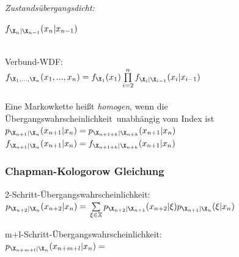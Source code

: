 \documentclass[german,color,6pt]{latex4ei/latex4ei_sheet}
\begin{document}
\begin{sectionbox}
	\emph{Zustandsübergangsdicht:} \\
	\centerline{$ f_{\X_{n} | \X_{n-1}}(x_{n} | x_{n-1})$}\\

	\qquad Verbund-WDF: \\
	$f_{\X_1,...,\X_n}(x_1,...,x_n)=f_{\X_1}(x_1)\prod\limits_{i=2}^{n}f_{\X_i|\X_{i-1}}(x_i|x_{i-1})$ \\ \\


	Eine Markowkette heißt \emph{homogen}, wenn die Übergangswahrscheinlichkeit\ unabhängig vom Index ist \\
	$p_{\X_{n+1} | \X_{n}} (x_{n+1} | x_{n}) = p_{\X_{n+1+k} | \X_{n+k}} (x_{n+1} | x_{n})$ \\
	$f_{\X_{n+1} | \X_{n}} (x_{n+1} | x_{n}) = f_{\X_{n+1+k} | \X_{n+k}} (x_{n+1} | x_{n})$ \\


	\subsubsection{Chapman-Kologorow Gleichung}
	2-Schritt-Übergangswahrscheinlichkeit: \\
	 $p_{\X_{n+2}|\X_n}(x_{n+2}|x_n)= \\ \sum\limits_{\xi\in\mathbb{X}}p_{\X_{n+2}|\X_{n+1}}(x_{n+2}|\xi)p_{\X_{n+1}|\X_n}(\xi |x_n)$

	m+l-Schritt-Übergangswahrscheinlichkeit: \\
	$p_{\X_{n+m+l}|\X_n}(x_{n+m+l}|x_n) =$\\
\end{sectionbox}
\end{document}
